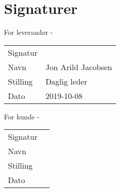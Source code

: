 \section{Signaturer}





\begin{center}
For leverandør - \suppliername

\begin{tabu} to 0.95\textwidth {  X[l]  X[l]  }

 Signatur & \hline  \\ 
 Navn & Jon Arild Jacobsen  \\ 
 Stilling & Daglig leder  \\ 
 Dato & 2019-10-08  \\ 

\end{tabu}
\end{center}

\vspace{2cm}


\begin{center}
For kunde - \customername	

 \begin{tabu} to 0.95\textwidth {  X[l]  X[l]  }
 Signatur & \hline  \\ 
 Navn & \hline  \\ 
 Stilling & \hline  \\ 
 Dato & \hline  \\ 
 \end{tabu}

\end{center}
